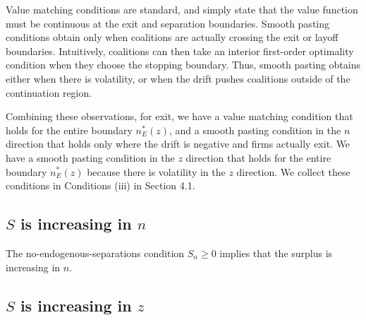 Value matching conditions are standard, and simply state that the value function must be continuous at the exit and separation boundaries. Smooth pasting conditions obtain only when coalitions are actually crossing the exit or layoff boundaries. Intuitively, coalitions can then take an interior first-order optimality condition when they choose the stopping boundary. Thus, smooth pasting obtains either when there is volatility, or when the drift pushes coalitions outside of the continuation region.

Combining these observations, for exit, we have a value matching condition that holds for the entire boundary $n_E^*(z)$, and a smooth pasting condition in the $n$ direction that holds only where the drift is negative and firms actually exit.  We have a smooth pasting condition in the $z$ direction that holds for the entire boundary $n_E^*(z)$ because there is volatility in the $z$ direction. We collect these conditions in Conditions (iii) in Section 4.1.


\subsection{$S$ is increasing in $n$}

The no-endogenous-separations condition $S_n \geq 0$ implies
that the surplus is increasing in $n$.

\subsection{$S$ is increasing in $z$}

